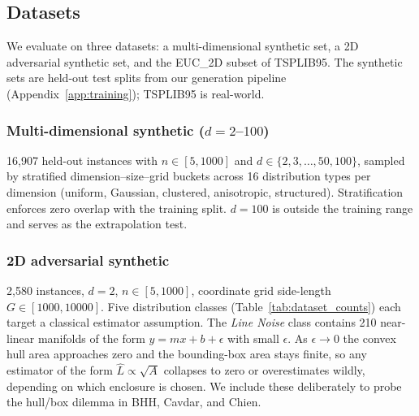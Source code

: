 \subsection{Datasets} \label{subsec:datasets}

We evaluate on three datasets: a multi-dimensional synthetic set, a 2D adversarial synthetic set, and the EUC\_2D subset of TSPLIB95. The synthetic sets are held-out test splits from our generation pipeline (Appendix~\ref{app:training}); TSPLIB95 is real-world.

\subsubsection{Multi-dimensional synthetic ($d = 2$--$100$)}
16{,}907 held-out instances with $n \in [5, 1000]$ and $d \in \{2, 3, \ldots, 50, 100\}$, sampled by stratified dimension--size--grid buckets across 16 distribution types per dimension (uniform, Gaussian, clustered, anisotropic, structured). Stratification enforces zero overlap with the training split. $d = 100$ is outside the training range and serves as the extrapolation test.

\subsubsection{2D adversarial synthetic}
2{,}580 instances, $d = 2$, $n \in [5, 1000]$, coordinate grid side-length $G \in [1000, 10000]$. Five distribution classes (Table~\ref{tab:dataset_counts}) each target a classical estimator assumption. The \textit{Line Noise} class contains 210 near-linear manifolds of the form $y = mx + b + \epsilon$ with small $\epsilon$. As $\epsilon \to 0$ the convex hull area approaches zero and the bounding-box area stays finite, so any estimator of the form $\hat L \propto \sqrt{A}$ collapses to zero or overestimates wildly, depending on which enclosure is chosen. We include these deliberately to probe the hull/box dilemma in BHH, Cavdar, and Chien.

